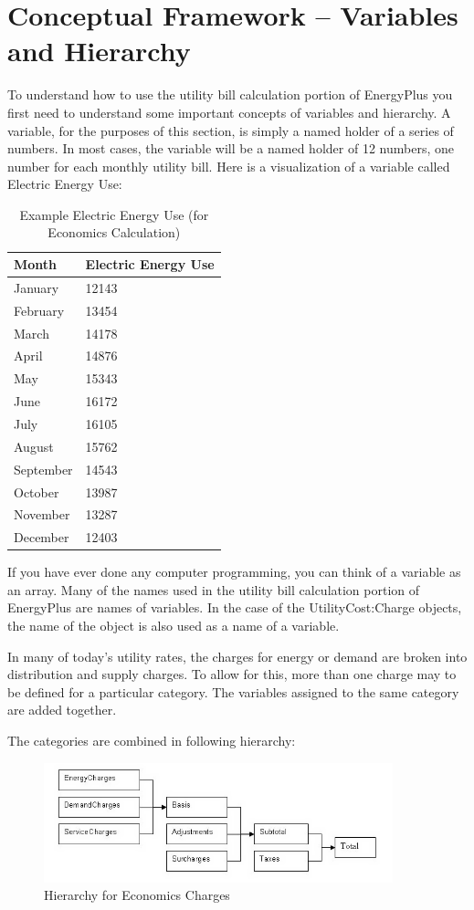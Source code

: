 \section{Conceptual Framework -- Variables and Hierarchy}\label{conceptual-framework-variables-and-hierarchy}

To understand how to use the utility bill calculation portion of EnergyPlus you first need to understand some important concepts of variables and hierarchy. A variable, for the purposes of this section, is simply a named holder of a series of numbers. In most cases, the variable will be a named holder of 12 numbers, one number for each monthly utility bill. Here is a visualization of a variable called Electric Energy Use:

\begin{longtable}[c]{@{}ll@{}}
\caption{Example Electric Energy Use (for Economics Calculation) \protect \label{table:example-electric-energy-use-for-economics}}\\
\toprule 
Month & Electric Energy Use \tabularnewline \midrule
\endhead
January & 12143 \tabularnewline
February & 13454 \tabularnewline
March & 14178 \tabularnewline
April & 14876 \tabularnewline
May & 15343 \tabularnewline
June & 16172 \tabularnewline
July & 16105 \tabularnewline
August & 15762 \tabularnewline
September & 14543 \tabularnewline
October & 13987 \tabularnewline
November & 13287 \tabularnewline
December & 12403 \tabularnewline
\bottomrule
\end{longtable}

If you have ever done any computer programming, you can think of a variable as an array. Many of the names used in the utility bill calculation portion of EnergyPlus are names of variables. In the case of the UtilityCost:Charge objects, the name of the object is also used as a name of a variable.

In many of today's utility rates, the charges for energy or demand are broken into distribution and supply charges. To allow for this, more than one charge may to be defined for a particular category. The variables assigned to the same category are added together.

The categories are combined in following hierarchy:

\begin{figure}[hbtp] %
\centering
\includegraphics[width=0.9\textwidth, height=0.9\textheight, keepaspectratio=true]{media/image615.png}
\caption{Hierarchy for Economics Charges \protect \label{fig:hierarchy-for-economics-charges}}
\end{figure}


